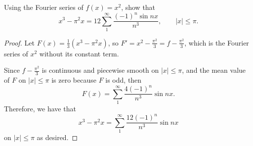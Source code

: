 \documentclass[../hw6]{subfiles}
\begin{document}
\begin{problem}
Using the Fourier series of $f(x)=x^2$, show that \[
	x^3-\pi^2x = 12 \sum_{1}^{\infty} \frac{(-1)^n \sin{nx} }{n^3}, \qquad |x|\le \pi
	.\]
\end{problem}
\begin{proof}
	Let $F(x)=\frac{1}{3}(x^3-\pi^2 x)$, so $F' = x^2-\frac{\pi^2}{3} = f-\frac{\pi^2}{3}$, which is the Fourier series of $x^2$ without its constant term.

	Since $f-\frac{\pi^2}{3}$ is continuous and piecewise smooth on  $|x|\le \pi$, and the mean value of $F$ on  $|x|\le \pi$ is zero because $F$ is odd, then \[
		F(x)=\sum_{1}^{\infty} \frac{4(-1)^n}{n^3}\sin{nx}
		.\]
	Therefore, we have that \[
		x^3-\pi^2 x = \sum_{1}^{\infty} \frac{12(-1)^n}{n^3}\sin{nx}
	\] on $|x|\le \pi$ as desired.
\end{proof}
\end{document}
